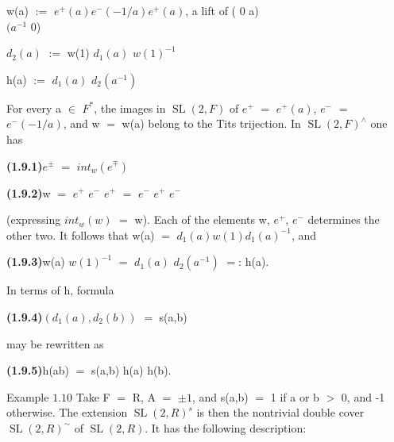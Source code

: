 \documentclass[10pt,a4paper]{article}
\begin{document}
\clearpage
{}
\label{d035-physical-011}
\par\smallskip\begin{center}\begin{minipage}{0.96\textwidth}\centering
w(a) $:=$ $e^+(a)e^-(-1/a)e^+(a)$, a lift of ( 0 a) \\ $(a^{-1}$ 0)
\end{minipage}\end{center}\smallskip
\par $d_2(a)$ $:=$ w(1) $d_1(a)$ $w(1)^{-1}$\par
\par h(a) $:=$ $d_1(a)$ $d_2(a^{-1})$\par
\par For every a $\in{}$ $F^*$, the images in $\operatorname{SL}(2,F)$ of $e^+$ $=$ $e^+(a)$, $e^-$ $=$ $e^-(-1/a)$, and w $=$ w(a) belong to the Tits trijection. In $\operatorname{SL}(2,F)^\wedge{}$ one has\par
\par\noindent\textbf{(1.9.1)}\quad $e^\pm{}$ $=$ $int_w(e^\mp{})$\par
\par\noindent\textbf{(1.9.2)}\quad w $=$ $e^+$ $e^-$ $e^+$ $=$ $e^-$ $e^+$ $e^-$\par
\par (expressing $int_w(w)$ $=$ w). Each of the elements w, $e^+$, $e^-$ determines the other two. It follows that w(a) $=$ $d_1(a)w(1)d_1(a)^{-1}$, and\par
\par\noindent\textbf{(1.9.3)}\quad w(a) $w(1)^{-1}$ $=$ $d_1(a)$ $d_2(a^{-1})$ $=$: h(a).\par
\par In terms of h, formula\par
\par\noindent\textbf{(1.9.4)}\quad $(d_1(a),d_2(b))$ $=$ s(a,b)\par
\par may be rewritten as\par
\par\noindent\textbf{(1.9.5)}\quad h(ab) $=$ s(a,b) h(a) h(b).\par
\par Example $1.10$ Take F $=$ R, A $=$ ${\pm{}1}$, and s(a,b) $=$ 1 if a or b $>$ 0, and -1 otherwise. The extension $\operatorname{SL}(2,R)^s$ is then the nontrivial double cover $\operatorname{SL}(2,R)^\sim$ of $\operatorname{SL}(2,R)$. It has the following description:\par
\end{document}
